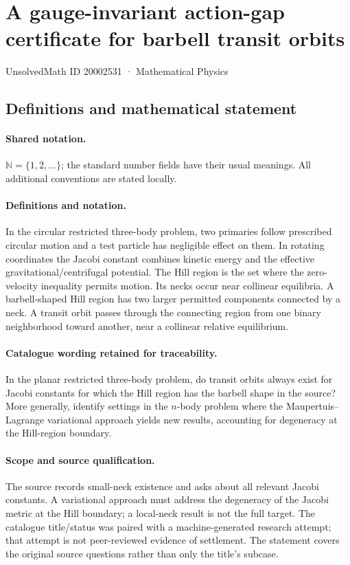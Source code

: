 \documentclass[11pt]{article}
\begin{document}
\setcounter{section}{20002530}
\section{A gauge-invariant action-gap certificate for barbell transit orbits}\label{20002531}
{\small UnsolvedMath ID 20002531 · Mathematical Physics}
\subsection{Definitions and mathematical statement}

\paragraph{Shared notation.}$\mathbb N=\{1,2,\ldots\}$; the standard number fields have their usual meanings. All additional conventions are stated locally.


\paragraph{Definitions and notation.}In the circular restricted three-body problem, two primaries follow prescribed circular motion and a test particle has negligible effect on them. In rotating coordinates the Jacobi constant combines kinetic energy and the effective gravitational/centrifugal potential. The Hill region is the set where the zero-velocity inequality permits motion. Its necks occur near collinear equilibria. A barbell-shaped Hill region has two larger permitted components connected by a neck. A transit orbit passes through the connecting region from one binary neighborhood toward another, near a collinear relative equilibrium.

\paragraph{Catalogue wording retained for traceability.}
In the planar restricted three-body problem, do transit orbits always exist for Jacobi constants for which the Hill region has the barbell shape in the source? More generally, identify settings in the $n$-body problem where the Maupertuis--Lagrange variational approach yields new results, accounting for degeneracy at the Hill-region boundary.
\paragraph{Scope and source qualification.}The source records small-neck existence and asks about all relevant Jacobi constants. A variational approach must address the degeneracy of the Jacobi metric at the Hill boundary; a local-neck result is not the full target. The catalogue title/status was paired with a machine-generated research attempt; that attempt is not peer-reviewed evidence of settlement. The statement covers the original source questions rather than only the title’s subcase.
\end{document}
